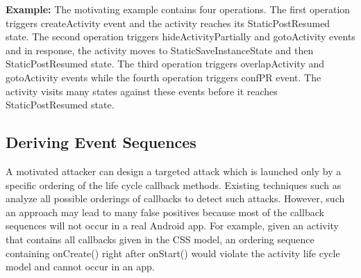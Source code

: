 \documentclass[10pt]{elsarticle}
\begin{document}
{\noindent \bf Example:} The motivating example contains four operations. The first operation triggers createActivity event and the activity reaches its StaticPostResumed state. The second operation triggers hideActivityPartially and gotoActivity events and in response, the activity moves to StaticSaveInstanceState and then StaticPostResumed state. The third operation triggers overlapActivity and gotoActivity events while the fourth operation triggers confPR event. The activity visits many states against these events before it reaches StaticPostResumed state. 


\subsection {Deriving Event Sequences} \label{secMalBhvrDetction}


A motivated attacker can design a targeted attack which is launched only by a specific ordering of the life cycle callback methods. Existing techniques such as \cite{DroidSafe} analyze all possible orderings of callbacks to detect such attacks. However, such an approach may lead to many false positives because most of the callback sequences will not occur in a real Android app. For example, given an activity that contains all callbacks given in the CSS model, an ordering sequence containing {\ttfamily onCreate()} right after {\ttfamily onStart()} would violate the activity life cycle model and cannot occur in an app. 
\end{document}
